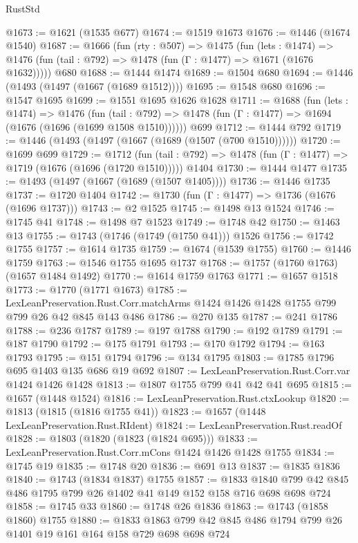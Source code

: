 \begin{lexlean}{RustStd}
\begin{coremodule}
@1673 := @1621 (@1535 @677)
@1674 := @1519 @1673
@1676 := @1446 (@1674 @1540)
@1687 := @1666
    (fun (rty : @507) =>
    @1475
      (fun (lets : @1474) =>
      @1476 (fun (tail : @792) => @1478 (fun (Γ : @1477) => @1671 (@1676 @1632)))))
    @680
@1688 := @1444 @1474
@1689 := @1504 @680
@1694 := @1446 (@1493 (@1497 (@1667 (@1689 @1512))))
@1695 := @1548 @680
@1696 := @1547 @1695
@1699 := @1551 @1695 @1626 @1628
@1711 := @1688
    (fun (lets : @1474) =>
    @1476
      (fun (tail : @792) => @1478 (fun (Γ : @1477) => @1694 (@1676 (@1696 (@1699 @1508 @1510))))))
    @699
@1712 := @1444 @792
@1719 := @1446 (@1493 (@1497 (@1667 (@1689 (@1507 (@700 @1510))))))
@1720 := @1699 @699
@1729 := @1712
    (fun (tail : @792) => @1478 (fun (Γ : @1477) => @1719 (@1676 (@1696 (@1720 @1510)))))
    @1404
@1730 := @1444 @1477
@1735 := @1493 (@1497 (@1667 (@1689 (@1507 @1405))))
@1736 := @1446 @1735
@1737 := @1720 @1404
@1742 := @1730 (fun (Γ : @1477) => @1736 (@1676 (@1696 @1737)))
@1743 := @2 @1525
@1745 := @1498 @13 @1524
@1746 := @1745 @41
@1748 := @1498 @7 @1523
@1749 := @1748 @42
@1750 := @1463 @13
@1755 := @1743 (@1746 (@1749 (@1750 @41))) @1526
@1756 := @1742 @1755
@1757 := @1614 @1735
@1759 := @1674 (@1539 @1755)
@1760 := @1446 @1759
@1763 := @1546 @1755 @1695 @1737
@1768 := @1757 (@1760 @1763) (@1657 @1484 @1492)
@1770 := @1614 @1759 @1763
@1771 := @1657 @1518
@1773 := @1770 (@1771 @1673)
@1785 := LexLeanPreservation.Rust.Corr.matchArms
    @1424
    @1426
    @1428
    @1755
    @799
    @799
    @26
    @42
    @845
    @143
    @486
@1786 := @270 @135
@1787 := @241 @1786
@1788 := @236 @1787
@1789 := @197 @1788
@1790 := @192 @1789
@1791 := @187 @1790
@1792 := @175 @1791
@1793 := @170 @1792
@1794 := @163 @1793
@1795 := @151 @1794
@1796 := @134 @1795
@1803 := @1785 @1796 @695 @1403 @135 @686 @19 @692
@1807 := LexLeanPreservation.Rust.Corr.var @1424 @1426 @1428
@1813 := @1807 @1755 @799 @41 @42 @41 @695
@1815 := @1657 (@1448 @1524)
@1816 := LexLeanPreservation.Rust.ctxLookup
@1820 := @1813 (@1815 (@1816 @1755 @41))
@1823 := @1657 (@1448 LexLeanPreservation.Rust.RIdent)
@1824 := LexLeanPreservation.Rust.readOf
@1828 := @1803 (@1820 (@1823 (@1824 @695)))
@1833 := LexLeanPreservation.Rust.Corr.mCons @1424 @1426 @1428 @1755
@1834 := @1745 @19
@1835 := @1748 @20
@1836 := @691 @13
@1837 := @1835 @1836
@1840 := @1743 (@1834 @1837) @1755
@1857 := @1833 @1840 @799 @42 @845 @486 @1795 @799 @26 @1402 @41 @149 @152 @158 @716 @698 @698 @724
@1858 := @1745 @33
@1860 := @1748 @26 @1836
@1863 := @1743 (@1858 @1860) @1755
@1880 := @1833 @1863 @799 @42 @845 @486 @1794 @799 @26 @1401 @19 @161 @164 @158 @729 @698 @698 @724

\end{coremodule}
\end{lexlean}
